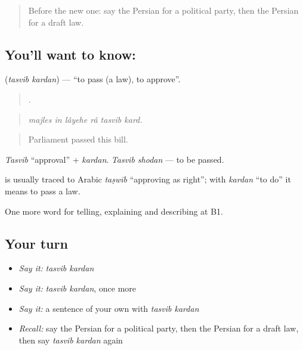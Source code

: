 \label{lesson:FA-C410-tasvib-kardan}



\begin{quote}
Before the new one: say the Persian for a political party, then the Persian for a draft law.
\end{quote}

\subsection*{You'll want to know:  }
\textbf{ } (\emph{tasvib kardan}) — \textquotedblleft{}to pass (a law), to approve\textquotedblright{}.

\begin{quote}
     .
\end{quote}

\begin{quote}
\emph{majles in lâyehe râ tasvib kard.}
\end{quote}

\begin{quote}
Parliament passed this bill.
\end{quote}

\emph{Tasvib} \textquotedblleft{}approval\textquotedblright{} + \emph{kardan}. \emph{Tasvib shodan} — to be passed.

\begin{cousinweb}
\textbf{} is usually traced to Arabic \emph{taṣwīb} \textquotedblleft{}approving as right\textquotedblright{}; with \emph{kardan} \textquotedblleft{}to do\textquotedblright{} it means to pass a law.
\end{cousinweb}

\begin{grammarlens}[title={What you've built}]
One more word for telling, explaining and describing at B1.
\end{grammarlens}

\subsection*{Your turn}
\begin{itemize}
\raggedright
  \item \emph{Say it:} \emph{tasvib kardan}
  \item \emph{Say it:} \emph{tasvib kardan}, once more
  \item \emph{Say it:} a sentence of your own with \emph{tasvib kardan}
  \item \emph{Recall:} say the Persian for a political party, then the Persian for a draft law, then say \emph{tasvib kardan} again
\end{itemize}

